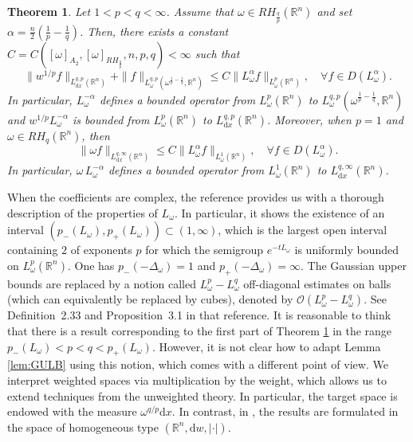 \documentclass[12pt, letterpaper]{amsart}
\newtheorem{thm}{Theorem}[section]
\theoremstyle{definition}
\theoremstyle{remark}
\numberwithin{equation}{section}
\begin{document}
{\begin{thm}\label{thm:principal avec coeff}
Let $1<p<q<\infty$. Assume that $\omega \in RH_{\frac{q}{p}}(\mathbb{R}^n)$ and set $\alpha=\frac{n}{2}(\frac{1}{p}-\frac{1}{q})$. Then, there exists a constant $C = C([ \omega  ]_{A_2},[ \omega  ]_{RH_{\frac{q}{p}}},n,p,q)<\infty$ such that
    \begin{equation*}
     \|w^{1/p} f \|_{L^{q,p}_{\mathrm{d}x}(\mathbb{R}^n)} +   \| f \|_{L^{q,p}_{\omega}(\omega^{\frac{1}{p}-\frac{1}{q}}, \mathbb{R}^n)} \leq C \| L_\omega^\alpha f \|_{L^p_{\omega}(\mathbb{R}^n)}, \quad \forall f \in D(L_\omega^\alpha).
    \end{equation*}
    In particular, $L_\omega^{-\alpha}$ defines a bounded operator from $L^p_\omega(\mathbb{R}^n)$ to $L^{q,p}_{\omega}(\omega^{\frac{1}{p}-\frac{1}{q}}, \mathbb{R}^n)$ and $w^{1/p}L_\omega^{-\alpha}$ is bounded from $L^p_\omega(\mathbb{R}^n)$ to $L^{q,p}_{\mathrm{d}x}(\mathbb{R}^n)$. {Moreover, when $p=1$ and $\omega\in RH_{{q}}(\mathbb{R}^n)$, then
    \begin{equation*}
        \| \omega  f \|_{L^{q,\infty}_{\mathrm{d}x}(\mathbb{R}^n)} \leq C \| L_\omega^{\alpha}  f \|_{L^1_{\omega}(\mathbb{R}^n)}, \quad \forall f \in D(L_\omega^\alpha).
    \end{equation*}
    In particular, $\omega \, L_\omega^{-\alpha}$ defines a bounded operator from $L^1_\omega(\mathbb{R}^n)$ to $L^{q,\infty}_{\mathrm{d}x}(\mathbb{R}^n)$.}
\end{thm}



When the coefficients are complex, the reference \cite{cruz2017kato} provides us with a thorough description of the properties of $L_\omega$. In particular, it shows the existence of an interval $(p_-(L_\omega), p_+(L_\omega)) \subset (1,\infty)$, which is the largest open interval containing $2$ of exponents $p$ for which the semigroup $e^{-tL_\omega}$ is uniformly bounded on $L^p_\omega(\mathbb{R}^n)$. One has $p_-(-\Delta_\omega)=1$ and $p_+(-\Delta_\omega)=\infty$. The Gaussian upper bounds are replaced by a notion called $L^p_\omega-L^q_\omega$ off-diagonal estimates on balls (which can equivalently be replaced by cubes), denoted by $\mathcal{O}(L^p_\omega - L^q_\omega)$. See Definition~2.33 and Proposition~3.1 in that reference. It is reasonable to think that there is a result corresponding to the first part of Theorem \ref{thm:principal avec coeff} in the range $p_-(L_\omega)<p<q< p_+(L_\omega)$. However, it is not clear how to adapt Lemma \ref{lem:GULB} using this notion, which comes with a different point of view. We interpret weighted spaces via multiplication by the weight, which allows us to extend techniques from the unweighted theory. In particular, the target space is endowed with the measure $\omega^{q/p}\mathrm{d}x$. In contrast, in \cite{cruz2017kato}, the results are formulated in the space of homogeneous type  $(\mathbb{R}^n,\mathrm{d}w,|\cdot|)$.




}
\end{document}

